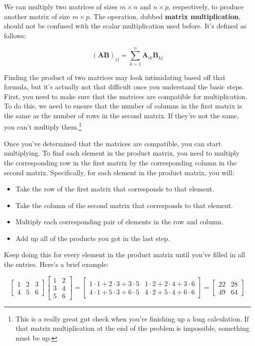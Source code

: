 \documentclass{report}
\begin{document}
\begin{onehalfspacing}
\begin{flushleft}
We can multiply two matrices of sizes \(m\times n\) and \(n\times p\), respectively, to produce another matrix of size \(m\times p\). The operation, dubbed \textbf{matrix multiplication}, should not be confused with the scalar multiplication used before. It's defined as follows:

\vspace{-0.1in}
\[(\textbf{AB})_{ij} = \sum_{k=1}^n \textbf{A}_{ik} \textbf{B}_{kj}\]

Finding the product of two matrices may look intimidating based off that formula, but it's actually not that difficult once you understand the basic steps. First, you need to make sure that the matrices are compatible for multiplication. To do this, we need to ensure that the number of columns in the first matrix is the same as the number of rows in the second matrix. If they're not the same, you can't multiply them.\footnote{This is a really great gut check when you're finishing up a long calculation. If that matrix multiplication at the end of the problem is impossible, something must be up.}

\medskip

Once you've determined that the matrices are compatible, you can start multiplying. To find each element in the product matrix, you need to multiply the corresponding row in the first matrix by the corresponding column in the second matrix. Specifically, for each element in the product matrix, you will:

\begin{itemize}[noitemsep]
    \item Take the row of the first matrix that corresponds to that element.
    \item Take the column of the second matrix that corresponds to that element.
    \item Multiply each corresponding pair of elements in the row and column.
    \item Add up all of the products you got in the last step.
\end{itemize}

Keep doing this for every element in the product matrix until you've filled in all the entries. Here's a brief example:

\[\begin{bmatrix}
    1 & 2 & 3 \\
    4 & 5 & 6
    \end{bmatrix}
    \begin{bmatrix}
    1 & 2 \\
    3 & 4 \\
    5 & 6
    \end{bmatrix}
    =
    \begin{bmatrix}
    1 \cdot 1 + 2 \cdot 3 + 3 \cdot 5 & 1 \cdot 2 + 2 \cdot 4 + 3 \cdot 6 \\
    4 \cdot 1 + 5 \cdot 3 + 6 \cdot 5 & 4 \cdot 2 + 5 \cdot 4 + 6 \cdot 6\end{bmatrix} = \begin{bmatrix} 22 & 28 \\ 49 & 64 \end{bmatrix}\]


\end{flushleft}
\end{onehalfspacing}
\end{document}
